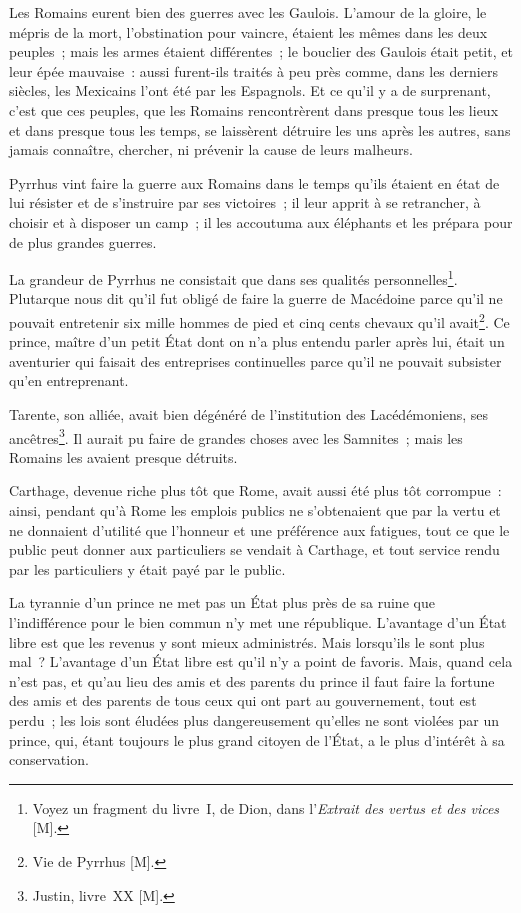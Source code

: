 \documentclass[french,twoside]{book} %
\newcommand\chaptercont{} %
\begin{document}
\chaptercont
\noindent Les Romains eurent bien des guerres avec les Gaulois. L’amour de la gloire, le mépris de la mort, l’obstination pour vaincre, étaient les mêmes dans les deux peuples ; mais les armes étaient différentes ; le bouclier des Gaulois était petit, et leur épée mauvaise : aussi furent-ils traités à peu près comme, dans les derniers siècles, les Mexicains l’ont été par les Espagnols. Et ce qu’il y a de surprenant, c’est que ces peuples, que les Romains rencontrèrent dans presque tous les lieux et dans presque tous les temps, se laissèrent détruire les uns après les autres, sans jamais connaître, chercher, ni prévenir la cause de leurs malheurs.\par
Pyrrhus vint faire la guerre aux Romains dans le temps qu’ils étaient en état de lui résister et de s’instruire par ses victoires ; il leur apprit à se retrancher, à choisir et à disposer un camp ; il les accoutuma aux éléphants et les prépara pour de plus grandes guerres.\par
La grandeur de Pyrrhus ne consistait que dans ses qualités personnelles\footnote{Voyez un fragment du livre I, de Dion, dans l’{\itshape Extrait des vertus et des vices} [M].}. Plutarque nous dit qu’il fut obligé de faire la guerre de Macédoine parce qu’il ne pouvait entretenir six mille hommes de pied et cinq cents chevaux qu’il avait\footnote{Vie de Pyrrhus [M].}. Ce prince, maître d’un petit État dont on n’a plus entendu parler après lui, était un aventurier qui faisait des entreprises continuelles parce qu’il ne pouvait subsister qu’en entreprenant.\par
Tarente, son alliée, avait bien dégénéré de l’institution des Lacédémoniens, ses ancêtres\footnote{Justin, livre XX [M].}. Il aurait pu faire de grandes choses avec les Samnites ; mais les Romains les avaient presque détruits.\par
Carthage, devenue riche plus tôt que Rome, avait aussi été plus tôt corrompue : ainsi, pendant qu’à Rome les emplois publics ne s’obtenaient que par la vertu et ne donnaient d’utilité que l’honneur et une préférence aux fatigues, tout ce que le public peut donner aux particuliers se vendait à Carthage, et tout service rendu par les particuliers y était payé par le public.\par
La tyrannie d’un prince ne met pas un État plus près de sa ruine que l’indifférence pour le bien commun n’y met une république. L’avantage d’un État libre est que les revenus y sont mieux administrés. Mais lorsqu’ils le sont plus mal ? L’avantage d’un État libre est qu’il n’y a point de favoris. Mais, quand cela n’est pas, et qu’au lieu des amis et des parents du prince il faut faire la fortune des amis et des parents de tous ceux qui ont part au gouvernement, tout est perdu ; les lois sont éludées plus dangereusement qu’elles ne sont violées par un prince, qui, étant toujours le plus grand citoyen de l’État, a le plus d’intérêt à sa conservation.\par
\end{document}
